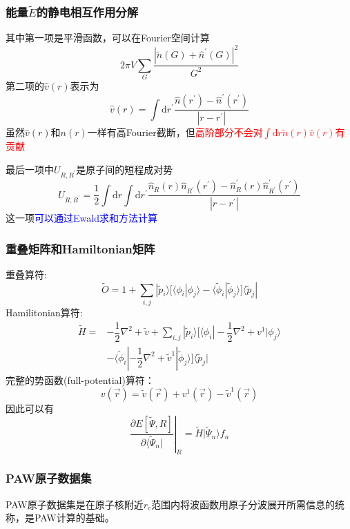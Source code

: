 {\frame
{
	\frametitle{能量$\tilde E$的静电相互作用分解}
	其中第一项是平滑函数，可以在\textrm{Fourier}空间计算
	$$2\pi V\sum_G\dfrac{|\tilde n(G)+\hat n^{\prime}(G)|^2}{G^2}$$
	第二项的$\hat v(r)$表示为
	$$\hat v(r)=\int\mathrm{d}r^{\prime}\dfrac{\hat n(r^{\prime})-\hat n^{\prime}(r^{\prime})}{|r-r^{\prime}|}$$
	虽然$\hat v(r)$和$n(r)$一样有高\textrm{Fourier}截断，但\textcolor{red}{高阶部分不会对$\int\mathrm{d}r\tilde n(r)\hat v(r)$有贡献}

	最后一项中$U_{R,R^{\prime}}$是原子间的短程成对势
	$$U_{R,R^{\prime}}=\dfrac12\int\mathrm{d}r\int\mathrm{d}r^{\prime}\dfrac{\hat n_R(r)\hat n_{R^{\prime}}(r^{\prime})-\hat n_R^{\prime}(r)\hat n_{R^{\prime}}^{\prime}(r^{\prime})}{|r-r^{\prime}|}$$
	这一项\textcolor{blue}{可以通过\textrm{Ewald}求和方法计算}
}

\frame
{
	\frametitle{重叠矩阵和\textrm{Hamiltonian}矩阵}
重叠算符:
$$\tilde O=1+\sum_{i,j}|\tilde p_i\rangle\bigg[\langle\phi_i|\phi_j\rangle-\langle\tilde\phi_i|\tilde\phi_j\rangle\bigg]\langle\tilde p_j|$$
\textrm{Hamilitonian}算符:
\begin{displaymath}
	\begin{aligned}
		\tilde H=&-\dfrac12\nabla^2+\tilde v+\sum_{i,j}|\tilde p_i\rangle\bigg[\langle\phi_i|-\dfrac12\nabla^2+v^1|\phi_j\rangle\\
			&-\langle\tilde\phi_i|-\dfrac12\nabla^2+\tilde v^1|\tilde\phi_j\rangle\bigg]\langle\tilde p_j| 
	\end{aligned}
\end{displaymath}
	完整的势函数\textrm{(full-potential)}算符：
$$v(\vec r)=\tilde v(\vec r)+v^1(\vec r)-\tilde v^1(\vec r)$$
因此可以有
$$\left.\dfrac{\partial E[\tilde\Psi, R]}{\partial\langle\tilde\Psi_n|}\right|_R=\tilde H|\tilde\Psi_n\rangle f_n$$
}

\frame
{
	\frametitle{\textrm{PAW}原子数据集}
\textrm{PAW}原子数据集是在原子核附近$r_c$范围内将波函数用原子分波展开所需信息的统称，是\textrm{PAW}计算的基础。

}}
